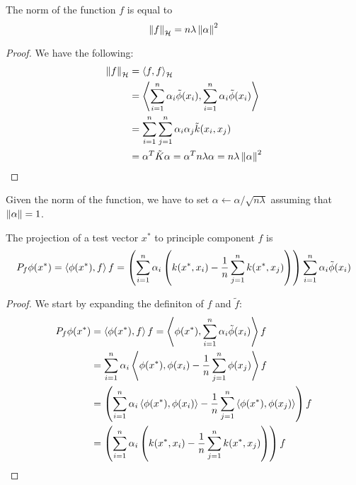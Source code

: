 \begin{proposition}
    The norm of the function $f$ is equal to 
    \begin{equation*}
        \left\lVert f\right\rVert_\mathcal{H} = n\lambda\left\lVert\alpha\right\rVert^2
    \end{equation*}
\end{proposition}
\begin{proof}
    We have the following:
    \begin{equation*}
    \begin{aligned}
        \left\lVert f\right\rVert_\mathcal{H} &= \left\langle f, f \right\rangle_\mathcal{H} \\
        &=\left\langle \sum_{i=1}^n\alpha_i\tilde{\phi}(x_i), \sum_{i=1}^n\alpha_i\tilde{\phi}(x_i) \right\rangle \\
        &=\sum^n_{i=1}\sum^n_{j=1}\alpha_i\alpha_j \tilde{k}(x_i, x_j) \\
        &= \alpha^T\tilde{K}\alpha = \alpha^Tn\lambda\alpha = n\lambda\left\lVert\alpha\right\rVert^2
    \end{aligned}
    \end{equation*}
\end{proof}

\begin{remark}
    Given the norm of the function, we have to set $\alpha \leftarrow \alpha/\sqrt{n\lambda}$ assuming that $\left\lVert\alpha\right\rVert = 1$.
\end{remark}

\begin{proposition}
    The projection of a test vector $x^*$ to principle component $f$ is 
    \begin{equation*}
        P_f\phi(x^*) = \left\langle \phi(x^*), f \right\rangle f = \left( \sum^n_{i=1}\alpha_i\left( k(x^*, x_i) - \frac{1}{n}\sum^n_{j=1}k(x^*, x_j) \right) \right) \sum_{i=1}^n\alpha_i\tilde{\phi}(x_i)
    \end{equation*}
\end{proposition}
\begin{proof}
    We start by expanding the definiton of $f$ and $\tilde{f}$:
    \begin{equation*}
    \begin{aligned}
        P_f\phi(x^*) &= \left\langle \phi(x^*), f \right\rangle f = \left\langle \phi(x^*), \sum_{i=1}^n\alpha_i\tilde{\phi}(x_i) \right\rangle f \\
        &= \sum^n_{i=1}\alpha_i\left\langle \phi(x^*), \phi(x_i) - \frac{1}{n} \sum^n_{j=1}\phi(x_j)  \right\rangle f \\
        &= \left( \sum^n_{i=1}\alpha_i \left\langle \phi(x^*), \phi(x_i) \right\rangle - \frac{1}{n}\sum^n_{j=1}\left\langle \phi(x^*), \phi(x_j) \right\rangle \right)f \\
        &= \left( \sum^n_{i=1}\alpha_i\left( k(x^*, x_i) - \frac{1}{n}\sum^n_{j=1}k(x^*, x_j) \right) \right) f
    \end{aligned}
    \end{equation*}
\end{proof}

